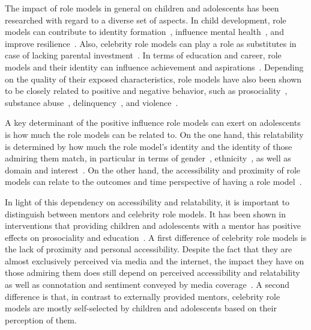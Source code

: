 The impact of role models in general on children and adolescents has been researched with regard to a diverse set of aspects. In child development, role models can contribute to identity formation~\autocite{vecci_behavioural_2019}, influence mental health~\autocite{bird_impact_2012}, and improve resilience~\autocite{werner_resilience_1995}. Also, celebrity role models can play a role as substitutes in case of lacking parental investment~\autocite{cheung_idol_2012}. In terms of education and career, role models and their identity can influence achievement and aspirations~\autocite{zirkel_is_2002, herrmann_effects_2016,christiansen_television_1979}. Depending on the quality of their exposed characteristics, role models have also been shown to be closely related to positive and negative behavior, such as prosociality~\autocite{kosse_formation_2020}, substance abuse~\autocite{yancey_role_2002, hurd_negative_2009}, delinquency~\autocite{walters_someone_2016}, and violence~\autocite{hurd_role_2011}.

A key determinant of the positive influence role models can exert on adolescents is how much the role models can be related to. On the one hand, this relatability is determined by how much the role model's identity and the identity of those admiring them match, in particular in terms of gender~\autocite{marx_female_2002, herrmann_effects_2016,lockwood_someone_2006}, ethnicity~\autocite{marx_obama_2009}, as well as domain and interest~\autocite{lockwood_superstars_1997}. On the other hand, the accessibility and proximity of role models can relate to the outcomes and time perspective of having a role model~\autocite{strasser-burke_who_2020, bird_impact_2012}.

In light of this dependency on accessibility and relatability, it is important to distinguish between mentors and celebrity role models. It has been shown in interventions that providing children and adolescents with a mentor has positive effects on prosociality and education~\autocite{kosse_formation_2020, falk_mentoring_2020, dubois_natural_2005,rhodes_agents_2002,heckman_understanding_2013}. A first difference of celebrity role models is the lack of proximity and personal accessibility. Despite the fact that they are almost exclusively perceived via media and the internet, the impact they have on those admiring them does still depend on perceived accessibility and relatability~\autocite{strasser-burke_who_2020, lockwood_superstars_1997} as well as connotation and sentiment conveyed by media coverage~\autocite{lines_villains_2001, adamson_female_2019}. A second difference is that, in contrast to externally provided mentors, celebrity role models are mostly self-selected by children and adolescents based on their perception of them.


